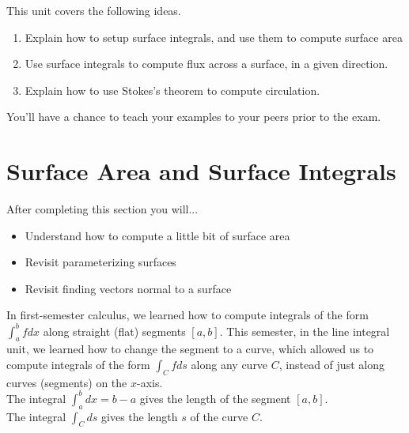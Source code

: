 
\noindent 
This unit covers the following ideas.     
\begin{enumerate}
\item Explain how to setup surface integrals, and use them to compute surface area
\item Use surface integrals to compute flux across a surface, in a given direction. %
\item Explain how to use Stokes's theorem to compute circulation. %
\end{enumerate}
You'll have a chance to teach your examples to your peers prior to the exam.

\newpage

\section{Surface Area and Surface Integrals}
After completing this section you will...
\begin{itemize}
\item Understand how to compute a little bit of surface area
\item Revisit parameterizing surfaces
\item Revisit finding vectors normal to a surface
\end{itemize}



In first-semester calculus, we learned how to compute integrals of the form $\int_a^b f dx$ along straight (flat) segments $[a,b]$. This semester, in the line integral unit, we learned how to change the segment to a curve, which allowed us to compute integrals of the form $\int_C fds$ along any curve $C$, instead of just along curves (segments) on the $x$-axis. \\

The integral $\int_a^b dx=b-a$ gives the length of the segment $[a,b]$. \\
The integral $\int_C ds$ gives the length $s$ of the curve $C$.\\

